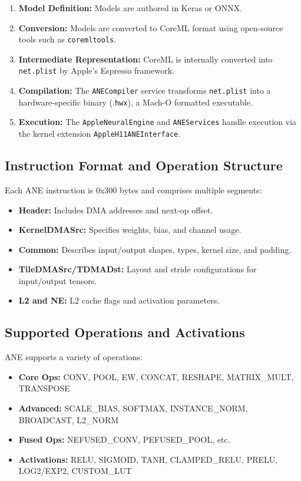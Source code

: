 \begin{enumerate}
  \item \textbf{Model Definition:} Models are authored in Keras or ONNX.
  \item \textbf{Conversion:} Models are converted to CoreML format using open-source tools such as \texttt{coremltools}.
  \item \textbf{Intermediate Representation:} CoreML is internally converted into \texttt{net.plist} by Apple's Espresso framework.
  \item \textbf{Compilation:} The \texttt{ANECompiler} service transforms \texttt{net.plist} into a hardware-specific binary (.\texttt{hwx}), a Mach-O formatted executable.
  \item \textbf{Execution:} The \texttt{AppleNeuralEngine} and \texttt{ANEServices} handle execution via the kernel extension \texttt{AppleH11ANEInterface}.
\end{enumerate}


\subsection{Instruction Format and Operation Structure}

Each ANE instruction is 0x300 bytes and comprises multiple segments:

\begin{itemize}
  \item \textbf{Header:} Includes DMA addresses and next-op offset.
  \item \textbf{KernelDMASrc:} Specifies weights, bias, and channel usage.
  \item \textbf{Common:} Describes input/output shapes, types, kernel size, and padding.
  \item \textbf{TileDMASrc/TDMADst:} Layout and stride configurations for input/output tensors.
  \item \textbf{L2 and NE:} L2 cache flags and activation parameters.
\end{itemize}

\subsection{Supported Operations and Activations}

ANE supports a variety of operations:

\begin{itemize}
  \item \textbf{Core Ops:} CONV, POOL, EW, CONCAT, RESHAPE, MATRIX\_MULT, TRANSPOSE
  \item \textbf{Advanced:} SCALE\_BIAS, SOFTMAX, INSTANCE\_NORM, BROADCAST, L2\_NORM
  \item \textbf{Fused Ops:} NEFUSED\_CONV, PEFUSED\_POOL, etc.
  \item \textbf{Activations:} RELU, SIGMOID, TANH, CLAMPED\_RELU, PRELU, LOG2/EXP2, CUSTOM\_LUT
\end{itemize}

